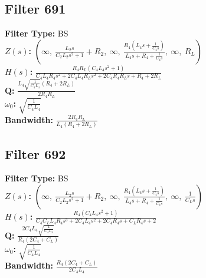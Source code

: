 \documentclass{article}
\begin{document}
\subsection*{Filter 691}
\textbf{Filter Type:} BS \\ 
\textbf{$Z(s)$:} $\left( \infty, \  \frac{L_{2} s}{C_{2} L_{2} s^{2} + 1} + R_{2}, \  \infty, \  \frac{R_{4} \left(L_{4} s + \frac{1}{C_{4} s}\right)}{L_{4} s + R_{4} + \frac{1}{C_{4} s}}, \  \infty, \  R_{L}\right)$ \\ 
\textbf{$H(s)$:} $\frac{R_{4} R_{L} \left(C_{4} L_{4} s^{2} + 1\right)}{C_{4} L_{4} R_{4} s^{2} + 2 C_{4} L_{4} R_{L} s^{2} + 2 C_{4} R_{4} R_{L} s + R_{4} + 2 R_{L}}$ \\ 
\textbf{Q:} $\frac{L_{4} \sqrt{\frac{1}{C_{4} L_{4}}} \left(R_{4} + 2 R_{L}\right)}{2 R_{4} R_{L}}$ \\ 
\textbf{$\omega_0$:} $\sqrt{\frac{1}{C_{4} L_{4}}}$ \\ 
\textbf{Bandwidth:} $\frac{2 R_{4} R_{L}}{L_{4} \left(R_{4} + 2 R_{L}\right)}$ \\ 
\subsection*{Filter 692}
\textbf{Filter Type:} BS \\ 
\textbf{$Z(s)$:} $\left( \infty, \  \frac{L_{2} s}{C_{2} L_{2} s^{2} + 1} + R_{2}, \  \infty, \  \frac{R_{4} \left(L_{4} s + \frac{1}{C_{4} s}\right)}{L_{4} s + R_{4} + \frac{1}{C_{4} s}}, \  \infty, \  \frac{1}{C_{L} s}\right)$ \\ 
\textbf{$H(s)$:} $\frac{R_{4} \left(C_{4} L_{4} s^{2} + 1\right)}{C_{4} C_{L} L_{4} R_{4} s^{3} + 2 C_{4} L_{4} s^{2} + 2 C_{4} R_{4} s + C_{L} R_{4} s + 2}$ \\ 
\textbf{Q:} $\frac{2 C_{4} L_{4} \sqrt{\frac{1}{C_{4} L_{4}}}}{R_{4} \left(2 C_{4} + C_{L}\right)}$ \\ 
\textbf{$\omega_0$:} $\sqrt{\frac{1}{C_{4} L_{4}}}$ \\ 
\textbf{Bandwidth:} $\frac{R_{4} \left(2 C_{4} + C_{L}\right)}{2 C_{4} L_{4}}$ \\ 
\end{document}
